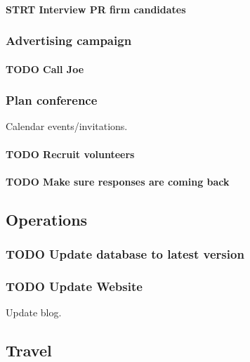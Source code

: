 \documentclass[11pt]{article}
\begin{document}
\paragraph*{STRT Interview PR firm candidates}
\label{sec:org5ab1a91}

\subsubsection*{Advertising campaign}
\label{sec:org75c2848}

\paragraph*{{\bfseries\sffamily TODO} Call Joe}
\label{sec:org2caa59c}

\subsubsection*{Plan conference}
\label{sec:org5d61045}

Calendar events/invitations.

\paragraph*{{\bfseries\sffamily TODO} Recruit volunteers}
\label{sec:org1095c15}

\paragraph*{{\bfseries\sffamily TODO} Make sure responses are coming back}
\label{sec:org2e98d51}

\subsection{Operations}
\label{sec:orgfac50de}

\subsubsection*{{\bfseries\sffamily TODO} Update database to latest version}
\label{sec:orgde363d5}

\subsubsection*{{\bfseries\sffamily TODO} Update Website}
\label{sec:org2000c58}

Update blog.

\subsection{Travel}
\label{sec:orgc616fc6}
\end{document}
